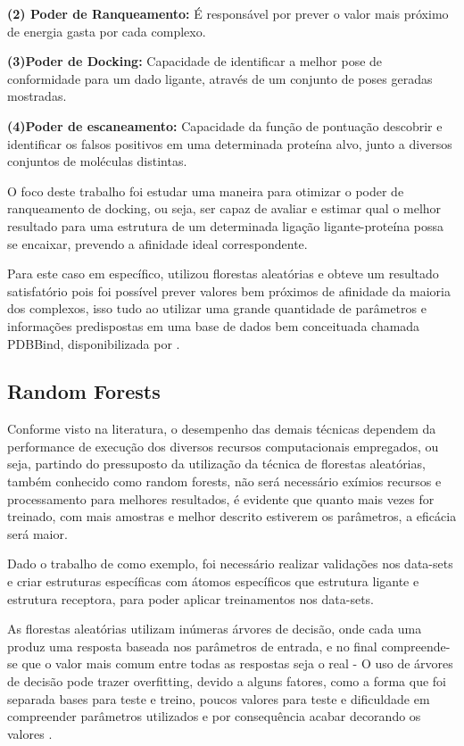\documentclass[tcc, capa]{texucpel}
\begin{document}
\textbf{(2) Poder de Ranqueamento:}
É responsável por prever o valor mais próximo de energia gasta por cada complexo.

\textbf{(3)Poder de Docking:} Capacidade de identificar a melhor pose de conformidade para um dado ligante, através de um conjunto de poses geradas mostradas.

\textbf{(4)Poder de escaneamento:} Capacidade da função de pontuação descobrir e identificar os falsos positivos em uma determinada proteína alvo, junto a diversos conjuntos de moléculas distintas.

O foco deste trabalho foi estudar uma maneira para otimizar o poder de ranqueamento de docking, ou seja, ser capaz de avaliar e estimar qual o melhor resultado para uma estrutura de um determinada ligação ligante-proteína possa se encaixar, prevendo a afinidade ideal correspondente.

Para este caso em específico,\cite{ballester2010machine} utilizou florestas aleatórias e obteve um resultado satisfatório pois foi possível prever valores bem próximos de afinidade da maioria dos complexos, isso tudo ao utilizar uma grande quantidade de parâmetros e informações predispostas em uma base de dados bem conceituada chamada PDBBind, disponibilizada por \cite{wang2004pdbbind}.

\subsection{Random Forests}
Conforme visto na literatura, o desempenho das demais técnicas dependem da performance de execução dos diversos recursos computacionais empregados, ou seja, partindo do pressuposto da utilização da técnica de florestas aleatórias, também conhecido como random forests, não será necessário exímios recursos e processamento para melhores resultados, é evidente que quanto mais vezes for treinado, com mais amostras e melhor descrito estiverem os parâmetros, a eficácia será maior.

Dado o trabalho de \cite{ballester2010machine} como exemplo, foi necessário realizar validações nos data-sets e criar estruturas específicas com átomos específicos que estrutura ligante e estrutura receptora, para poder aplicar treinamentos nos data-sets.

As florestas aleatórias utilizam inúmeras árvores de decisão, onde cada uma produz uma resposta baseada nos parâmetros de entrada, e no final compreende-se que o valor mais comum entre todas as respostas seja o real -\cite{breiman2001random}
O uso de árvores de decisão pode trazer overfitting, devido a alguns fatores, como a forma que foi separada bases para teste e treino, poucos valores para teste e dificuldade em compreender parâmetros utilizados e por consequência acabar decorando os valores \cite{liaw2002classification}.
\end{document}
